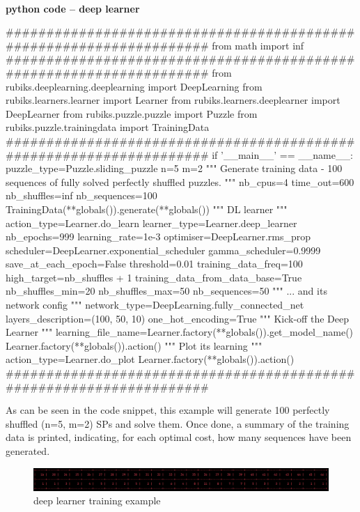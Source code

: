 \paragraph{}{\textbf{python code -- deep learner}}
\begin{python}
####################################################################
from math import inf
####################################################################
from rubiks.deeplearning.deeplearning import DeepLearning
from rubiks.learners.learner import Learner
from rubiks.learners.deeplearner import DeepLearner
from rubiks.puzzle.puzzle import Puzzle
from rubiks.puzzle.trainingdata import TrainingData
####################################################################
if '__main__' == __name__:
    puzzle_type=Puzzle.sliding_puzzle
    n=5
    m=2
    """ Generate training data - 100 sequences of fully 
    solved perfectly shuffled puzzles. 
    """
    nb_cpus=4
    time_out=600
    nb_shuffles=inf
    nb_sequences=100
    TrainingData(**globals()).generate(**globals())
    """ DL learner """
    action_type=Learner.do_learn
    learner_type=Learner.deep_learner
    nb_epochs=999
    learning_rate=1e-3
    optimiser=DeepLearner.rms_prop
    scheduler=DeepLearner.exponential_scheduler
    gamma_scheduler=0.9999
    save_at_each_epoch=False
    threshold=0.01
    training_data_freq=100
    high_target=nb_shuffles + 1
    training_data_from_data_base=True
    nb_shuffles_min=20
    nb_shuffles_max=50
    nb_sequences=50
    """ ... and its network config """
    network_type=DeepLearning.fully_connected_net
    layers_description=(100, 50, 10)
    one_hot_encoding=True
    """ Kick-off the Deep Learner """
    learning_file_name=Learner.factory(**globals()).get_model_name()
    Learner.factory(**globals()).action()
    """ Plot its learning """
    action_type=Learner.do_plot
    Learner.factory(**globals()).action()
####################################################################
\end{python}
\black

As can be seen in the code snippet, this example will generate 100 perfectly shuffled (n=5, m=2) SPs and solve them. Once done, a summary of the training data is printed, indicating, for each optimal cost, how many sequences have been generated.

\begin{figure}[H]
\centering
\includegraphics[scale=0.45]{./Figures/exampledeeplearnertraining}
\caption[Examples]{deep learner training example}
\label{fig:exampledeeplearnertraining}
\end{figure}

